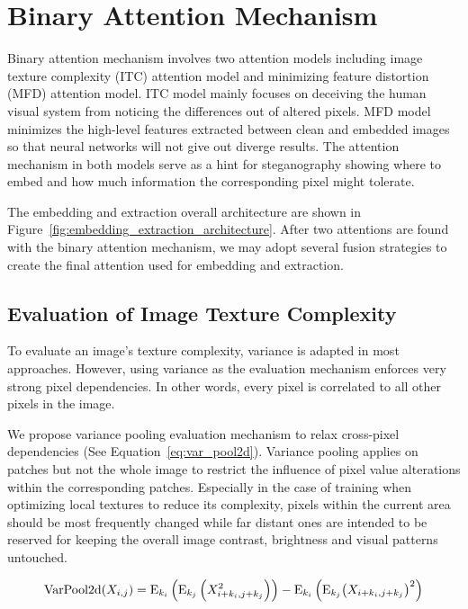 \section{Binary Attention Mechanism}

Binary attention mechanism involves two attention models including image texture complexity (ITC) attention model and minimizing feature distortion (MFD) attention model. ITC model mainly focuses on deceiving the human visual system from noticing the differences out of altered pixels. MFD model minimizes the high-level features extracted between clean and embedded images so that neural networks will not give out diverge results. The attention mechanism in both models serve as a hint for steganography showing where to embed and how much information the corresponding pixel might tolerate.

The embedding and extraction overall architecture are shown in Figure~\ref{fig:embedding_extraction_architecture}. After two attentions are found with the binary attention mechanism, we may adopt several fusion strategies to create the final attention used for embedding and extraction.

\figureEmbeddingExtractionArchitecture%

\subsection{Evaluation of Image Texture Complexity}

To evaluate an image's texture complexity, variance is adapted in most approaches. However, using variance as the evaluation mechanism enforces very strong pixel dependencies. In other words, every pixel is correlated to all other pixels in the image.

We propose variance pooling evaluation mechanism to relax cross-pixel dependencies (See Equation~\ref{eq:var_pool2d}). Variance pooling applies on patches but not the whole image to restrict the influence of pixel value alterations within the corresponding patches. Especially in the case of training when optimizing local textures to reduce its complexity, pixels within the current area should be most frequently changed while far distant ones are intended to be reserved for keeping the overall image contrast, brightness and visual patterns untouched.

\begin{equation}
  \mathrm{VarPool2d}(X_{i,j}) %
    = \E_{k_i} \left( \E_{k_j} \left( X_{i+k_i,j+k_j}^2 \right) \right) %
    - \E_{k_i} \left( \E_{k_j} {\left( X_{i+k_i,j+k_j} \right)}^2 \right)
  \label{eq:var_pool2d}
\end{equation}

